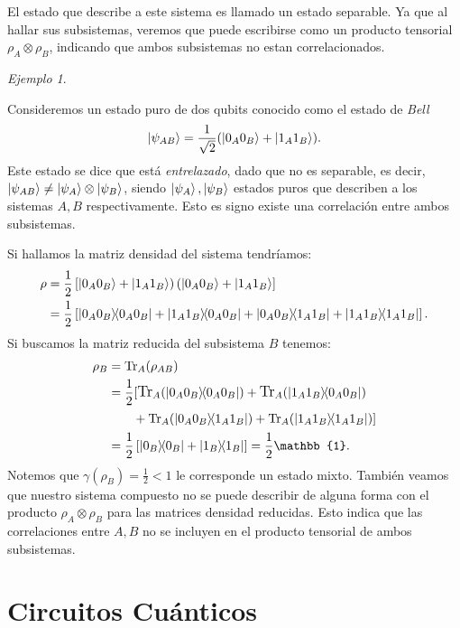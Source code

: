 \documentclass[letterpaper,12pt]{thesisECFM}
\theoremstyle{plain}
\theoremstyle{definition}
\theoremstyle{definition}
\theoremstyle{remark}
\newcommand{\1}{\mathbb{1}}
\newtheorem{ex}{Ejemplo}[section]
\begin{document}
El estado que describe a este sistema es llamado un estado separable. Ya que al hallar sus subsistemas, veremos que puede escribirse como un producto tensorial $\rho_A \otimes \rho_B$, indicando que ambos subsistemas no estan correlacionados.   

\begin{ex} \label{ex: traza parcial2} \end{ex} 
Consideremos un estado puro de dos qubits conocido como el estado de \textit{Bell} 
\begin{equation}
\label{ec:1.45}
    \ket{\psi_{AB}}=\frac{1}{\sqrt{2}} (\ket{0_A0_B} + \ket{1_A1_B}  ).
\end{equation}
Este estado se dice que está \textit{entrelazado}, dado que no es separable, es decir, $ \ket{\psi_{AB}} \neq \ket{\psi_A} \otimes \ket{\psi_B}$, siendo $\ket{\psi_A},\ket{\psi_B}$ estados puros que describen a los sistemas $A,B$ respectivamente. Esto es signo existe una correlación entre ambos subsistemas.

 Si hallamos la matriz densidad del sistema tendríamos:
\begin{align}
    \rho & =  \frac{1}{2}\left[ \ket{0_A0_B} + \ket{1_A1_B}        \right)\left( \ket{0_A0_B} + \ket{1_A1_B}        \right]\\
        & = \frac{1}{2} \left[ \ketbra{0_A0_B} + \ketbra{1_A1_B}{0_A0_B} + \ketbra{0_A0_B}{1_A1_B} + \ketbra{1_A1_B} \right].
\end{align}
Si buscamos la matriz reducida del subsistema $B$ tenemos:
\begin{align}
    \rho_B  & = \text{Tr}_A(\rho_{AB})\\
        & =  \frac{1}{2} \large[ \text{Tr}_A(\ketbra{0_A0_B}) + \text{Tr}_A(\ketbra{1_A1_B}{0_A0_B})\\
        & \qquad +\text{Tr}_A(\ketbra{0_A0_B}{1_A1_B}) + \text{Tr}_A(\ketbra{1_A1_B}{1_A1_B})  \large] \\
      & = \frac{1}{2} \left[ \ketbra{0_B} + \ketbra{1_B}  \right]  = \frac{1}{2} \mathbb{1}.
\end{align}
Notemos que $\gamma({\rho_B}) = \frac{1}{2} < 1$ le corresponde un estado mixto. También veamos que nuestro sistema compuesto no se puede describir de alguna forma con el producto $\rho_A \otimes \rho_B$ para las matrices densidad reducidas. Esto indica que las correlaciones entre $A,B$ no se incluyen en el producto tensorial de ambos subsistemas. 

\section{Circuitos Cuánticos} %
\label{sec:circuitos_cuanticos}
\end{document}
